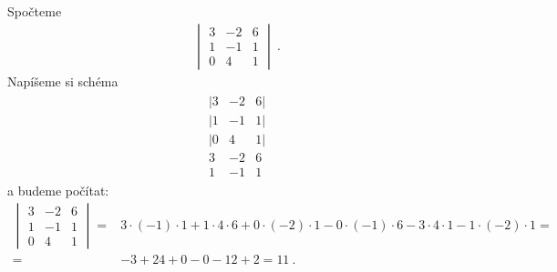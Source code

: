 \begin{itemize}
    \begin{example}
        Spočteme \begin{align}
            \begin{vmatrix}
                3 & -2 & 6 \\
                1 & -1 & 1 \\
                0 & 4 & 1 
            \end{vmatrix} \:.
        \end{align}
        Napíšeme si schéma \begin{align}
            \begin{array}{ccc}
                | 3 & -2 & 6 |\\
                | 1 & -1 & 1 |\\
                | 0 & 4 & 1 | \\
                3 & -2 & 6 \\
                1 & -1 & 1
            \end{array}
        \end{align}
        a budeme počítat:
        \begin{align}
            \begin{vmatrix}
                3 & -2 & 6 \\
                1 & -1 & 1 \\
                0 & 4 & 1 
            \end{vmatrix} =& 3 \cdot (-1) \cdot 1 + 1 \cdot 4 \cdot 6 + 0 \cdot (-2) \cdot 1 - 0 \cdot (-1) \cdot 6 - 3 \cdot 4 \cdot 1 - 1 \cdot (-2) \cdot 1 
            = \\ =& -3 + 24 + 0 - 0 - 12 + 2 = 11 \:.
        \end{align}
    \end{example}
    

\end{itemize}
